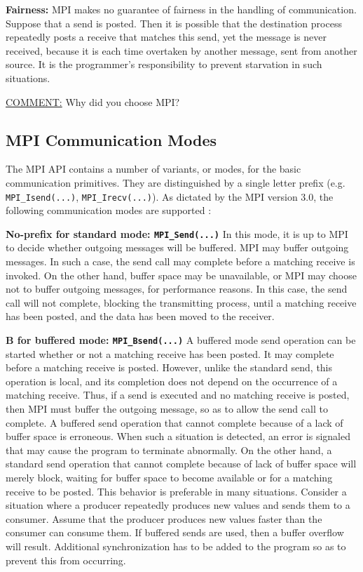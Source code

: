 \documentclass[12pt,twoside]{article}
\begin{document}
\textbf{Fairness:}
MPI makes no guarantee of fairness in the handling of communication. 
Suppose that a send is posted. 
Then it is possible that the destination process repeatedly posts a receive that matches this send, 
yet the message is never received, 
because it is each time overtaken by another message, 
sent from another source. 
It is the programmer’s responsibility to prevent starvation in such situations.

\uline{COMMENT:} Why did you choose MPI?


\subsection{MPI Communication Modes}
\label{sec-5-4}
The MPI API contains a number of variants, or modes, for the basic communication primitives.
They are distinguished by a single letter prefix (e.g. \texttt{MPI\_Isend(...)}, \texttt{MPI\_Irecv(...)}).
As dictated by the MPI version 3.0, the following communication modes are supported \cite{MessagePassingInterfaceForum2012}:

\textbf{No-prefix for standard mode: \texttt{MPI\_Send(...)}}
In this mode, it is up to MPI to decide whether outgoing messages will be buffered. 
MPI may buffer outgoing messages. 
In such a case, the send call may complete before a matching receive is invoked. 
On the other hand, buffer space may be unavailable, or MPI may choose not to buffer outgoing messages, for performance reasons. 
In this case, the send call will not complete, blocking the transmitting process, until a matching receive has been posted, and the data has been moved to the receiver.

\textbf{B for buffered mode: \texttt{MPI\_Bsend(...)}} 
A buffered mode send operation can be started whether or not a matching receive has been posted. 
It may complete before a matching receive is posted. 
However, unlike the standard send, this operation is local, and its completion does not depend on the occurrence of a matching receive. 
Thus, if a send is executed and no matching receive is posted, then MPI must buffer the outgoing message, so as to allow the send call to complete. 
A buffered send operation that cannot complete because of a lack of buffer space is erroneous. 
When such a situation is detected, an error is signaled that may cause the program to terminate abnormally. 
On the other hand, a standard send operation that cannot complete because of lack of buffer space will merely block, 
waiting for buffer space to become available or for a matching receive to be posted. 
This behavior is preferable in many situations. 
Consider a situation where a producer repeatedly produces new values and sends them to a consumer. 
Assume that the producer produces new values faster than the consumer can consume them. 
If buffered sends are used, then a buffer overflow will result. 
Additional synchronization has to be added to the program so as to prevent this from occurring. 
\end{document}
